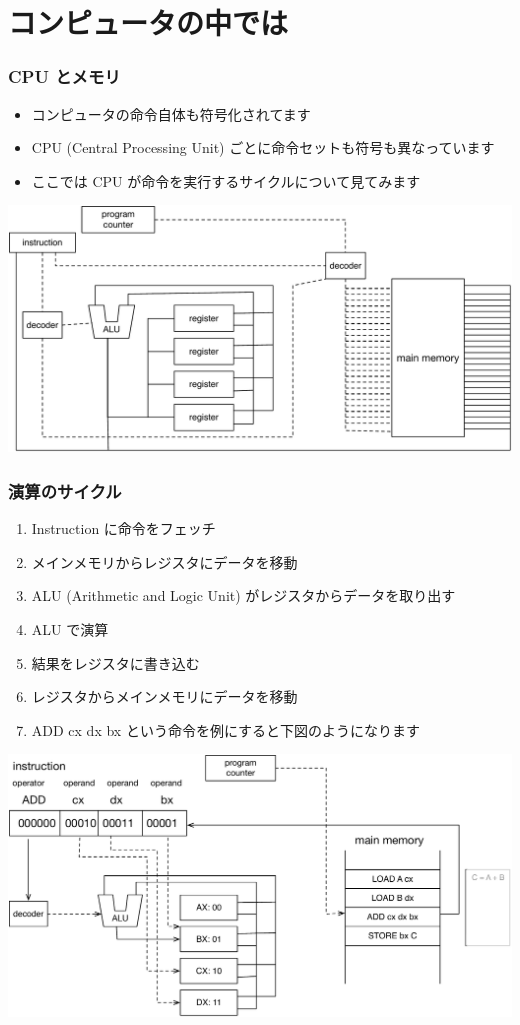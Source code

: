 \section{コンピュータの中では}
\begin{frame}[shrink]
\frametitle{CPU とメモリ}
  \begin{itemize}
\item コンピュータの命令自体も符号化されてます
\item CPU (Central Processing Unit) ごとに命令セットも符号も異なっています
\item ここでは CPU が命令を実行するサイクルについて見てみます
  \end{itemize}
  \begin{center}
\includegraphics[scale=0.3]{./Figure/elementaryCS-figCPU}
  \end{center}
\end{frame}
\begin{frame}[shrink]
\frametitle{演算のサイクル}
  \begin{enumerate}
\scriptsize
\item Instruction に命令をフェッチ
\item メインメモリからレジスタにデータを移動
\item ALU (Arithmetic and Logic Unit) がレジスタからデータを取り出す
\item ALU で演算
\item 結果をレジスタに書き込む
\item レジスタからメインメモリにデータを移動
\item ADD cx dx bx という命令を例にすると下図のようになります
  \end{enumerate}
  \begin{center}
\includegraphics[scale=0.3]{./Figure/elementaryCS-figCycle}
  \end{center}
\end{frame}

